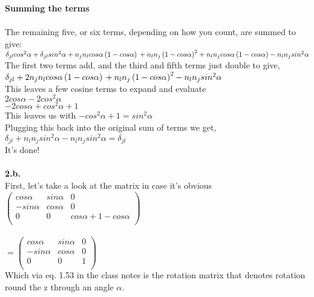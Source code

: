 \documentclass[prb,preprint]
{revtex4-1}
\newcommand{\PRLsep}{\noindent\makebox[\linewidth]{\resizebox{0.8888\linewidth}{2pt}{$\bullet$}}\bigskip}
\begin{document}
{\bf Summing the terms}\\\\
The remaining five, or six terms, depending on how you count, are summed to give:\\
$\delta_{jl} cos^2 \alpha + \delta_{jl} sin^2 \alpha + n_j n_l cos \alpha \left(1 - cos \alpha \right)\\
+ n_l n_j \left(1 - cos \alpha \right)^2 + n_l n_j cos \alpha \left(1 - cos \alpha \right) - n_l n_j sin^2 \alpha$\\
The first two terms add, and the third and fifth terms just double to give, \\
$\delta_{jl} + 2 n_j n_l cos \alpha \left(1 - cos \alpha \right)\\
+ n_l n_j \left(1 - cos \alpha \right)^2 - n_l n_j sin^2 \alpha$\\
This leaves a few cosine terms to expand and evaluate\\
$2 cos\alpha - 2 cos^2 \alpha$\\
$-2 cos\alpha + cos^2 \alpha + 1$\\
This leaves us with $-cos^2 \alpha + 1 = sin^2 \alpha$\\
Plugging this back into the original sum of terms we get, \\
$\delta_{jl} + n_l n_j sin^2 \alpha - n_l n_j sin^2 \alpha = \delta_{jl}$\\
It's done!
\\
\PRLsep
\\
{\bf 2.b.}
\\
First, let's take a look at the matrix in case it's obvious
\\
$\begin{pmatrix}
cos\alpha & sin\alpha & 0\\
-sin\alpha & cos\alpha & 0\\
0 & 0 & cos\alpha + 1 - cos\alpha \\
\end{pmatrix}$
\\
\\
$= \begin{pmatrix}
cos\alpha & sin\alpha & 0\\
-sin\alpha & cos\alpha & 0\\
0 & 0 & 1 \\
\end{pmatrix}$
\\
Which via eq. 1.53 in the class notes is the rotation matrix that denotes rotation round the z through an angle $\alpha$.
\\
\end{document}
